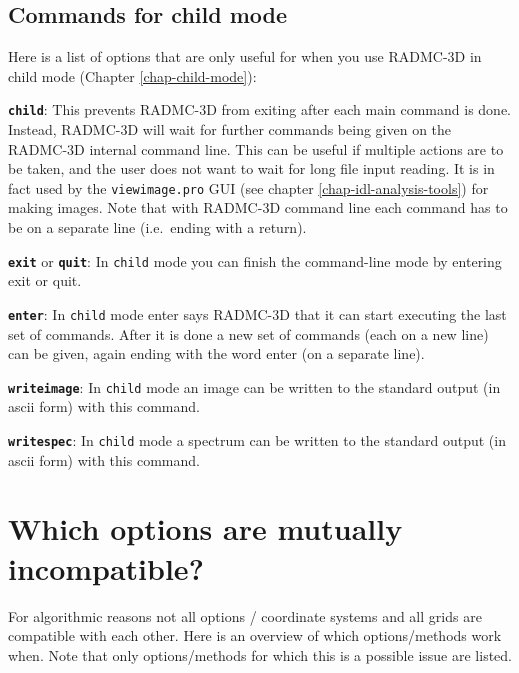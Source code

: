 \documentclass{report}
\newenvironment{options}%
  {\begin{list}{}{%
    \setlength{\topsep}{1em}%
    \setlength{\parskip}{0em}%
    \setlength{\parsep}{0em}%
    \setlength{\itemsep}{1em}%
    \setlength{\rightmargin}{0em}%
    \setlength{\leftmargin}{9em}%
    \setlength{\labelsep}{1em}%
    \setlength{\labelwidth}{6em}%
    \setlength{\itemindent}{0em}}\normalfont}%
  {\end{list}}
\begin{document}
\section{Commands for child mode}
Here is a list of options that are only useful for when you use RADMC-3D
in child mode (Chapter \ref{chap-child-mode}):
\begin{options}
\item[{\small\tt\bf child}:\hfill] This prevents RADMC-3D from exiting after each main
  command is done. Instead, RADMC-3D will wait for further commands being
  given on the RADMC-3D internal command line. This can be useful if
  multiple actions are to be taken, and the user does not want to wait for
  long file input reading. It is in fact used by the {\small\tt viewimage.pro} GUI
  (see chapter \ref{chap-idl-analysis-tools}) for making images. Note that
  with RADMC-3D command line each command has to be on a separate line 
  (i.e.\ ending with a return). 
\item[{\small\tt\bf exit} or {\small\tt\bf quit}:\hfill] In {\small\tt child} mode you can finish
  the command-line mode by entering exit or quit.
\item[{\small\tt\bf enter}:\hfill] In {\small\tt child} mode enter says RADMC-3D that it can start
  executing the last set of commands. After it is done a new set of commands
  (each on a new line) can be given, again ending with the word enter (on a
  separate line).
\item[{\small\tt\bf writeimage}:\hfill] In {\small\tt child} mode an image can be written to the
  standard output (in ascii form) with this command.
\item[{\small\tt\bf writespec}:\hfill] In {\small\tt child} mode a spectrum can be written to the
  standard output (in ascii form) with this command.
\end{options}


\chapter{Which options are mutually incompatible?}
\label{chap-table-possibilities}
For algorithmic reasons not all options / coordinate systems and all grids
are compatible with each other. Here is an overview of which options/methods
work when. Note that only options/methods for which this is a possible issue
are listed. 
\end{document}
